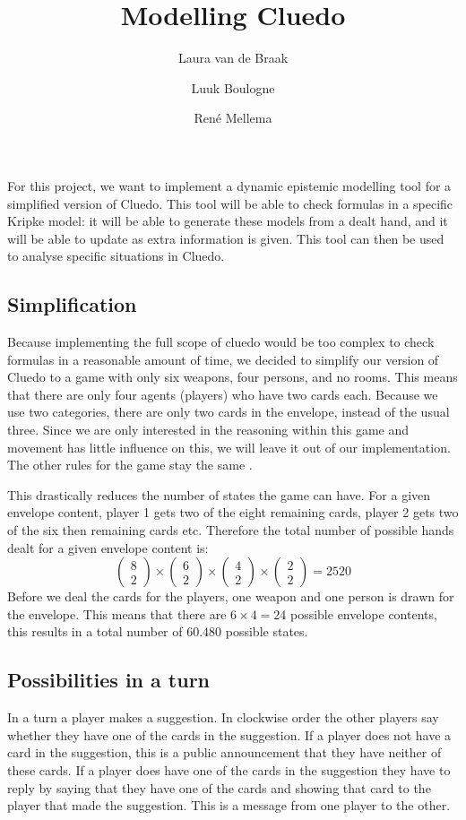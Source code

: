 \documentclass[a4paper, 10pt]{article}
\title{Modelling Cluedo}
\author{Laura van de Braak \and Luuk Boulogne \and Ren\'e Mellema}
\date{}
\newcommand{\abov}[2]{\left(\begin{array}{c} #1 \\ #2 \end{array}\right)}
\begin{document}
\maketitle

\noindent For this project, we want to implement a dynamic epistemic modelling tool
for a simplified version of Cluedo. This tool will be able to check
formulas in a specific Kripke model: it will be able to generate these
models from a dealt hand, and it will be able to update as extra information is given. This tool can then be used to analyse specific situations in
Cluedo.

\subsection{Simplification}
Because implementing the full scope of cluedo would be too complex to check formulas in a reasonable amount of time, we decided to simplify our version of Cluedo to a game with only six weapons, four persons, and no rooms. This means that there are only four agents (players) who have two cards each. Because we use two categories, there are only two cards in the envelope, instead of the usual three. Since we are only interested in the reasoning within this game and movement has little influence on this, we will leave it out of our implementation. The other rules for the game stay the same \citep{cluedo}.

This drastically reduces the number of states the game can have. For a
given envelope content, player 1 gets two of the eight remaining cards, player
2 gets two of the six then remaining cards etc. Therefore the total number
of possible hands dealt for a given envelope content is:
\begin{equation}
    \abov{8}{2} \times \abov{6}{2} \times \abov{4}{2} \times \abov{2}{2} =
    2520
\end{equation}
Before we deal the cards for the players, one weapon and one person is drawn
for the envelope. This means that there are $6 \times 4 = 24$ possible
envelope contents, this results in a total number of $60.480$ possible
states.

\subsection{Possibilities in a turn}
In a turn a player makes a suggestion. In clockwise order the other players say
whether they have one of the cards in the suggestion. If a player does not
have a card in the suggestion, this is a public announcement that they have
neither of these cards. If a player does have one of the cards in the suggestion
they have to reply by saying that they have one of the cards and showing
that card to the player that made the suggestion. This is a message from one
player to the other.





\end{document}
